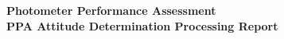 \documentclass[letterpaper]{article}
\begin{document}
\begin{titlepage}

  

  \begin{center}
    {\Huge \textbf{Photometer Performance Assessment}}\\[1ex]
    {\Large \textbf{PPA Attitude Determination Processing Report}}
  \end{center}

  

\end{titlepage}

\setcounter{page}{2}
\clearpage
\tableofcontents

\clearpage
{}
\setcounter{page}{1}






\end{document}

